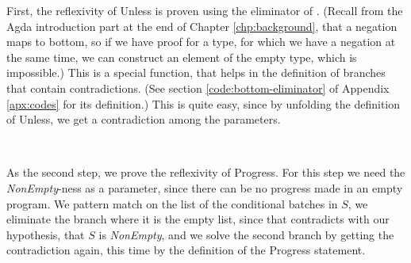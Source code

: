 First, the reflexivity of Unless is proven using the eliminator of \bot. (Recall from the Agda introduction part at the end of Chapter \ref{chp:background}, that a negation maps to bottom, so if we have proof for a type, for which we have a negation at the same time, we can construct an element of the empty type, which is impossible.) This is a special function, that helps in the definition of branches that contain contradictions. (See section \ref{code:bottom-eliminator} of Appendix \ref{apx:codes} for its definition.) This is quite easy, since by unfolding the definition of Unless, we get a contradiction among the parameters.

\begin{code}
    \>[2]\AgdaSpace{}%
    \AgdaSymbol{:}\AgdaSpace{}%
    \AgdaSpace{}%
    \AgdaOperator{\AgdaFunction{▷[}}\AgdaSpace{}%
    \AgdaSpace{}%
    \AgdaOperator{\AgdaFunction{]}}\AgdaSpace{}%
    \<%
    \\
    \>[2]\AgdaSpace{}%
    \AgdaSymbol{(}\AgdaSpace{}%
    \AgdaOperator{\AgdaInductiveConstructor{,}}\AgdaSpace{}%
    \AgdaSymbol{)}\AgdaSpace{}%
    \AgdaSymbol{=}\AgdaSpace{}%
    \AgdaSpace{}%
    \AgdaSymbol{(}\AgdaSpace{}%
    \AgdaSymbol{)}\<%
\end{code}

As the second step, we prove the reflexivity of Progress. For this step we need the \textit{NonEmpty}-ness as a parameter, since there can be no progress made in an empty program.
We pattern match on the list of the conditional batches in $S$, we eliminate the branch where it is the empty list, since that contradicts with our hypothesis, that $S$ is \textit{NonEmpty}, and we solve the second branch by getting the contradiction again, this time by the definition of the Progress statement.

